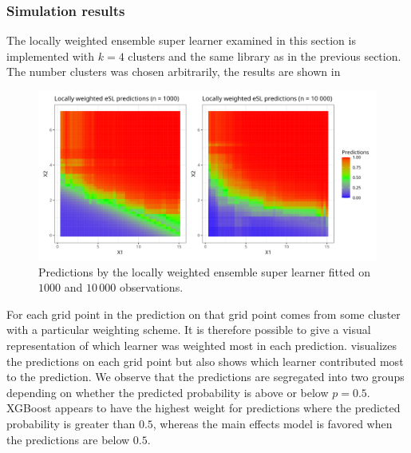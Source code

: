 \documentclass[./main.tex]{subfiles}
\begin{document}
\subsubsection{Simulation results}
The locally weighted ensemble super learner examined in this section is implemented with $ k = 4 $ clusters and the same library as in the previous section. The number clusters was chosen arbitrarily, the results are shown in 
\begin{figure}[H]
    \centering
    \includegraphics[width=\textwidth]{figures/esl_preds_lw.png}
    \caption{Predictions by the locally weighted ensemble super learner fitted on $ 1000 $ and $ 10\,000 $ observations.}
    \label{fig:esl_preds_lw}
\end{figure}
For each grid point in  the prediction on that grid point comes from some cluster with a particular weighting scheme. It is therefore possible to give a visual representation of which learner was weighted most in each prediction.  visualizes the predictions on each grid point but also shows which learner contributed most to the prediction. We observe that the predictions are segregated into two groups depending on whether the predicted probability is above or below $ p = 0.5 $. XGBoost appears to have the highest weight for predictions where the predicted probability is greater than $ 0.5 $, whereas the main effects model is favored when the predictions are below $ 0.5 $. 
\end{document}
